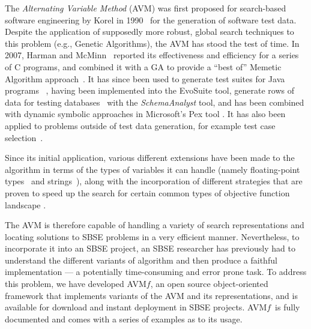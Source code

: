 \documentclass{llncs}
\newcommand{\AVM}{Alternating Variable Method\xspace}
\newcommand{\name}{AVM\hspace{-1pt}$f$\xspace}
\begin{document}
\vspace{-.5ex}
The {\it \AVM} (AVM) was first proposed for search-based software engineering by Korel in 1990~\cite{Korel1990}
for the generation of software test data.
Despite the application of supposedly more robust, global search techniques to this problem (e.g., Genetic Algorithms), the AVM has stood the test of time. In 2007, Harman and McMinn~\cite{Harman2007} reported its effectiveness and efficiency for a series of C programs, and combined it with a GA to provide a ``best of'' Memetic Algorithm approach~\cite{Harman2010}. It has since been used to generate test suites for Java programs~
\cite{%
Fraser2015b}, having been implemented into the {\sc EvoSuite} tool, generate rows of data for testing databases~\cite{Kapfhammer2013,McMinn2015} with the {\it SchemaAnalyst} tool, and has been combined with dynamic symbolic approaches in Microsoft's Pex tool \cite{Lakhotia2010}.
It has also been applied to problems outside of test data generation, for example test case selection~\cite{Pradhan2016}.

Since its initial application, various different extensions have been made to the algorithm in terms of the types of variables it can handle (namely floating-point types~\cite{Harman2007} and strings~\cite{McMinn2015}), along with the incorporation of different strategies that are proven to speed up the search for certain common types of objective function landscape
\cite{%
Kempka2015}.

The AVM is therefore capable of handling a variety of search representations and locating solutions to SBSE problems in a very efficient manner. Nevertheless, to incorporate it into an SBSE project, an SBSE researcher has previously had to understand the different variants of algorithm and then produce a faithful implementation --- a potentially time-consuming and error prone task. To address this problem, we have developed \name, an open source object-oriented framework that implements variants of the AVM and its representations, and is available for download and instant deployment in SBSE projects. \name~is fully documented and comes with a series of examples as to its usage.
\end{document}
